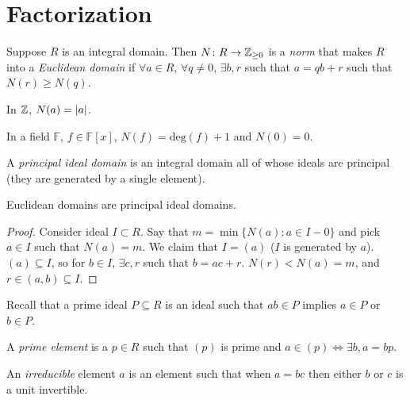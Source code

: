 \documentclass[a4paper,twoside,master.tex]{subfiles}
\begin{document}


\section{Factorization}
\label{sec:factorization}

\begin{definition}
    Suppose $ R $ is an integral domain. Then $ N\colon R \to \mathbb{Z}_{\geq 0} $ is a \textit{norm} that makes $ R $ into a \textit{Euclidean domain} if $ \forall a \in R $, $ \forall q \neq 0 $, $ \exists b,r $ such that $ a = qb + r $ such that $ N(r) \geq N(q) $.
\end{definition}

\begin{ex}
    In $ \mathbb{Z} $, $ N(a) = \abs{a} $.
\end{ex}
\begin{ex}
    In a field $\mathbb{F}$, $ f \in \mathbb{F}[x] $, $ N(f) = \text{deg}(f) + 1 $ and $ N(0) = 0 $.
\end{ex}


\begin{definition}
    A \textit{principal ideal domain} is an integral domain all of whose ideals are principal (they are generated by a single element).
\end{definition}

\begin{claim}
    Euclidean domains are principal ideal domains.
\end{claim}
\begin{proof}
    Consider ideal $ I \subset R $. Say that $ m = \min \{N(a) \colon a \in I-0\} $ and pick $ a \in I $ such that $ N(a) = m $. We claim that $ I = (a) $ ($ I $ is generated by $ a $). $ (a)\subseteq I $, so for $ b \in I $, $ \exists c,r $ such that $ b = ac + r $. $ N(r) < N(a) = m $, and $ r \in (a,b) \subseteq I $.
\end{proof}

Recall that a prime ideal $ P \subseteq R $ is an ideal such that $ ab\in P $ implies $ a \in P $ or $ b \in P $.

\begin{definition}
    A \textit{prime element} is a $ p \in R $ such that $ (p) $ is prime and $ a \in (p) \iff \exists b, a = b p $.
\end{definition}

\begin{definition}
    An \textit{irreducible} element $ a $ is an element such that when $ a = b c $ then either $ b $ or $ c $ is a unit invertible.
\end{definition}
\end{document}
